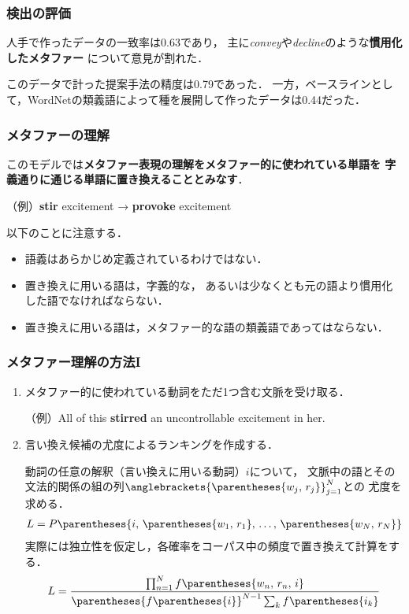 \documentclass[11pt]{beamer}
\newlength{\la}
\newcommand\metaphorical[1]{\textcolor{sRed}{\textbf{#1}}}
\newcommand\literal[1]{\textcolor{sDarkBlue}{\textbf{#1}}}
\begin{document}
\begin{frame}
\frametitle{検出の評価}
人手で作ったデータの一致率は0.63であり，
主に\emph{convey}や\emph{decline}のような\textbf{慣用化したメタファー}
について意見が割れた．

\bigskip

このデータで計った提案手法の精度は0.79であった．
一方，ベースラインとして，WordNetの類義語によって種を展開して作ったデータは0.44だった．

\end{frame}

\begin{frame}
\frametitle{メタファーの理解}
このモデルでは\textbf{メタファー表現の理解をメタファー的に使われている単語を
字義通りに通じる単語に置き換えることとみなす}．

（例）\metaphorical{stir} excitement → \literal{provoke} excitement

\bigskip

以下のことに注意する．
\begin{itemize}
    \item 語義はあらかじめ定義されているわけではない．
    \item 置き換えに用いる語は，字義的な，
        あるいは少なくとも元の語より慣用化した語でなければならない．
    \item 置き換えに用いる語は，メタファー的な語の類義語であってはならない．
\end{itemize}
\end{frame}

\begin{frame}
\frametitle{メタファー理解の方法I}
\setlength{\leftmargini}{0em}
\begin{enumerate}
    \item メタファー的に使われている動詞をただ1つ含む文脈を受け取る．

        （例）All of this \metaphorical{stirred} an uncontrollable excitement in her.

    \item 言い換え候補の尤度によるランキングを作成する．

        動詞の任意の解釈（言い換えに用いる動詞）$i$について，
        文脈中の語とその文法的関係の組の列$\anglebrackets{\parentheses{w_j,\,r_j}}_{j = 1}^N$との
        尤度を求める．
        \begin{align*}
            L = P\parentheses{i,\,\parentheses{w_1,\,r_1},\,\ldots,\,\parentheses{w_N,\,r_N}}
        \end{align*}
        実際には独立性を仮定し，各確率をコーパス中の頻度で置き換えて計算をする．
        \begin{align*}
            L = \frac{\prod_{n = 1}^N f\parentheses{w_n,\,r_n,\,i}}{%
            \parentheses{{f\parentheses{i}}}^{N - 1}\sum_k f\parentheses{i_k}}
        \end{align*}

\end{enumerate}
\end{frame}
\end{document}
